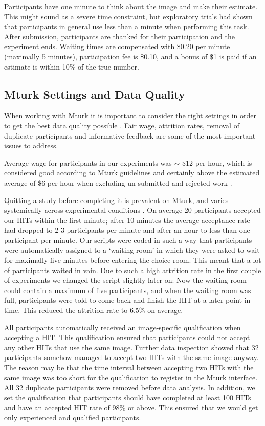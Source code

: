 \documentclass[9pt,a4paper,twocolumn,lineno]{article}
\begin{document}
Participants have one minute to think about the image and make their estimate. This might sound as a severe time constraint, but exploratory trials had shown that participants in general use less than a minute when performing this task. After submission, participants are thanked for their participation and the experiment ends. Waiting times are compensated with \$0.20 per minute (maximally 5 minutes), participation fee is \$0.10, and a bonus of \$1 is paid if an estimate is within 10\% of the true number.

\subsection*{Mturk Settings and Data Quality}
When working with Mturk it is important to consider the right settings in order to get the best data quality possible \cite{chandler2016conducting}. Fair wage, attrition rates, removal of duplicate participants and informative feedback are some of the most important issues to address.

Average wage for participants in our experiments was $\sim$ \$12 per hour, which is considered good according to Mturk guidelines and certainly above the estimated average of \$6 per hour when excluding un-submitted and rejected work \cite{hara2018data}.

Quitting a study before completing it is prevalent on Mturk, and varies systemically across experimental conditions \cite{zhou2016pitfall}. On average 20 participants accepted our HITs within the first minute; after 10 minutes the average acceptance rate had dropped to 2-3 participants per minute and after an hour to less than one participant per minute. Our scripts were coded in such a way that participants were automatically assigned to a ‘waiting room’ in which they were asked to wait for maximally five minutes before entering the choice room. This meant that a lot of participants waited in vain. Due to such a high attrition rate in the first couple of experiments we changed the script slightly later on: Now the waiting room could contain a maximum of five participants, and when the waiting room was full, participants were told to come back and finish the HIT at a later point in time. This reduced the attrition rate to 6.5\% on average.

All participants automatically received an image-specific qualification when accepting a HIT. This qualification ensured that participants could not accept any other HITs that use the same image. Further data inspection showed that 32 participants somehow managed to accept two HITs with the same image anyway. The reason may be that the time interval between accepting two HITs with the same image was too short for the qualification to register in the Mturk interface. All 32 duplicate participants were removed before data analysis. In addition, we set the qualification that participants should have completed at least 100 HITs and have an accepted HIT rate of 98\% or above. This ensured that we would get only experienced and qualified participants.
\end{document}
